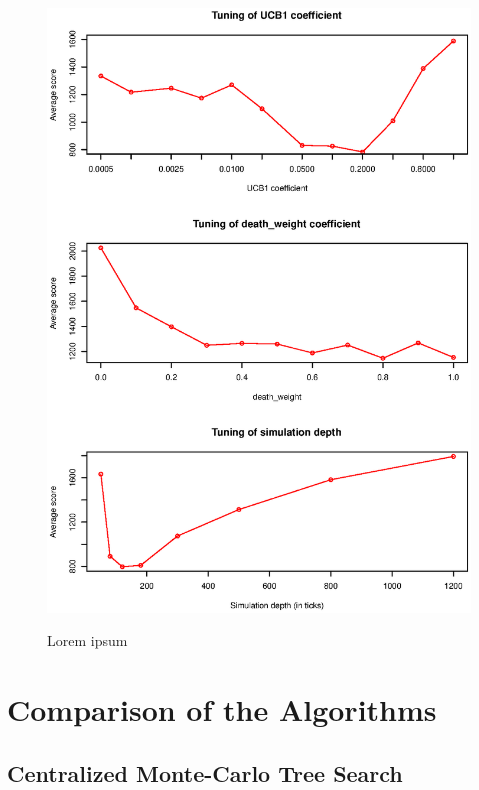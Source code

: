 \begin{figure}
\begin{center}
\includegraphics{img/mcts-tuning.eps}
\end{center}
\caption{\footnotesize Lorem ipsum}{\footnotesize }
\label{fig_mcts_tuning}
\end{figure}


\section{Comparison of the Algorithms}

\subsection{Centralized Monte-Carlo Tree Search}

